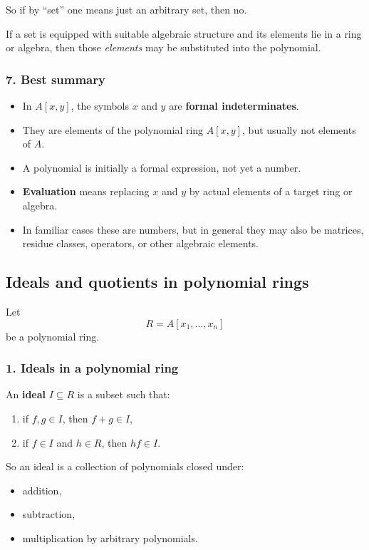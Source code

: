 \documentclass[12pt,a4paper]{article}
\theoremstyle{plain}
\theoremstyle{definition}      %
\begin{document}
	So if by ``set'' one means just an arbitrary set, then no.
	
	If a set is equipped with suitable algebraic structure and its elements lie in a ring or algebra, then those \emph{elements} may be substituted into the polynomial.
	
	\subsubsection*{7. Best summary}
	
	\begin{itemize}
		\item In \(A[x,y]\), the symbols \(x\) and \(y\) are \textbf{formal indeterminates}.
		\item They are elements of the polynomial ring \(A[x,y]\), but usually not elements of \(A\).
		\item A polynomial is initially a formal expression, not yet a number.
		\item \textbf{Evaluation} means replacing \(x\) and \(y\) by actual elements of a target ring or algebra.
		\item In familiar cases these are numbers, but in general they may also be matrices, residue classes, operators, or other algebraic elements.
	\end{itemize}
	
	
	\subsection*{Ideals and quotients in polynomial rings}
	
	Let
	\[
	R=A[x_1,\dots,x_n]
	\]
	be a polynomial ring.
	
	\subsubsection*{1. Ideals in a polynomial ring}
	
	An \textbf{ideal} \(I\subseteq R\) is a subset such that:
	\begin{enumerate}
		\item if \(f,g\in I\), then \(f+g\in I\),
		\item if \(f\in I\) and \(h\in R\), then \(hf\in I\).
	\end{enumerate}
	
	So an ideal is a collection of polynomials closed under:
	\begin{itemize}
		\item addition,
		\item subtraction,
		\item multiplication by arbitrary polynomials.
	\end{itemize}
	
\end{document}
